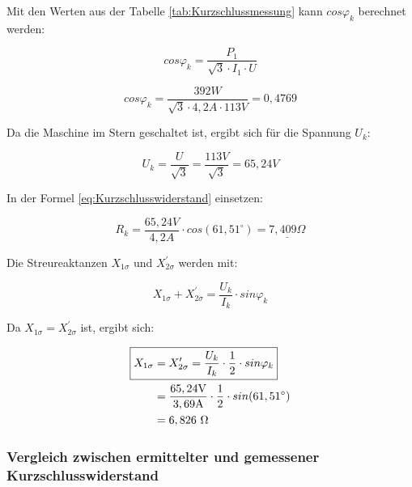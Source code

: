 \documentclass[conference]{IEEEtran}
\begin{document}
Mit den Werten aus der Tabelle \ref{tab:Kurzschlussmessung} kann $cos\varphi_k$
berechnet werden:

\begin{equation}
    \boxed{cos\varphi_k = \frac{P_1}{\sqrt{3} \cdot I_1 \cdot U}}
\end{equation}

\begin{equation} \label{eq:cosphi_solved}
    cos\varphi_k = \frac{392 \si{W}}{\sqrt{3} \cdot 4,2 \si{A} \cdot 113 \si{V}} = 0,4769
\end{equation}

Da die Maschine im Stern geschaltet ist, ergibt sich für die Spannung $U_k$:

\begin{equation} \label{eq:Uk_solved}
    \boxed{U_k = \frac{U}{\sqrt{3}}} = \frac{113 \si{V}}{\sqrt{3}} = 65,24 \si{V}
\end{equation}

In der Formel \ref{eq:Kurzschlusswiderstand} einsetzen:

\begin{equation} \label{eq:Kurzschlusswiderstand_calc}
    \boxed{R_k = \frac{65,24\si{V}}{4,2\si{A}}\cdot cos(61,51^\circ) = \underline{7,409 \Omega}}
\end{equation}

Die Streureaktanzen $X_{1\sigma}$ und $X_{2\sigma}^\prime$ werden mit:

\begin{equation} \label{eq:Streureaktanzen}
    X_{1\sigma} + X_{2\sigma}^\prime = \frac{U_k}{I_k}\cdot sin\varphi_k
\end{equation}

Da $X_{1\sigma} = X_{2\sigma}^\prime$ ist, ergibt sich:

\begin{align} \label{eq:Streureaktanzen_solved}
    \Aboxed{X_{1\sigma} & = X_{2\sigma}^\prime = \frac{U_k}{I_k}\cdot\frac{1}{2}\cdot sin\varphi_k} \\
                        & = \frac{65,24\si{V}}{3,69\si{A}}\cdot\frac{1}{2}\cdot sin(61,51^\circ)    \\
                        & =6,826\ \Omega
\end{align}

\subsubsection{Vergleich zwischen ermittelter und gemessener Kurzschlusswiderstand}
\end{document}
